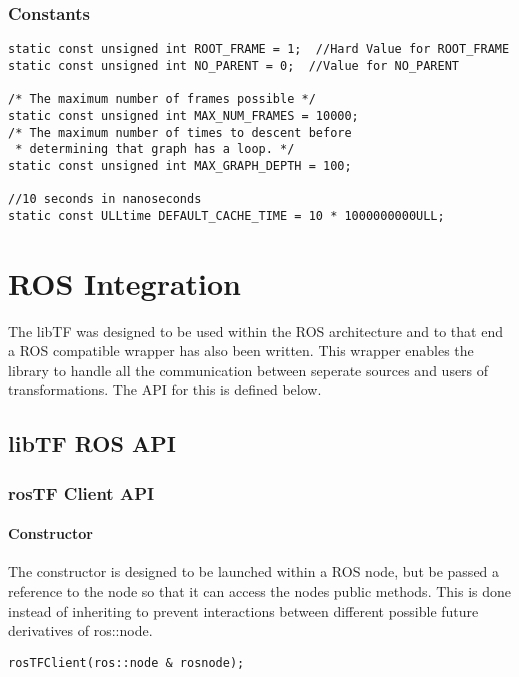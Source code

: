 \documentclass[12pt]{article}
\begin{document}
\subsubsection{Constants}
\begin{verbatim}
static const unsigned int ROOT_FRAME = 1;  //Hard Value for ROOT_FRAME
static const unsigned int NO_PARENT = 0;  //Value for NO_PARENT

/* The maximum number of frames possible */
static const unsigned int MAX_NUM_FRAMES = 10000;   
/* The maximum number of times to descent before 
 * determining that graph has a loop. */
static const unsigned int MAX_GRAPH_DEPTH = 100; 

//10 seconds in nanoseconds
static const ULLtime DEFAULT_CACHE_TIME = 10 * 1000000000ULL; 

\end{verbatim}

\section{ROS Integration}
The libTF was designed to be used within the ROS architecture and to that end 
a ROS compatible wrapper has also been written.  This wrapper enables the library
to handle all the communication between seperate sources and users of transformations.
The API for this is defined below.

\subsection{libTF ROS API}

\subsubsection {rosTF Client API}
\paragraph {Constructor}
The constructor is designed to be launched within a ROS node, but be passed a reference to 
the node so that it can access the nodes public methods.  This is done instead of inheriting
to prevent interactions between different possible future derivatives of ros::node. 
\begin{verbatim}
rosTFClient(ros::node & rosnode);
\end{verbatim}

\end{document}
